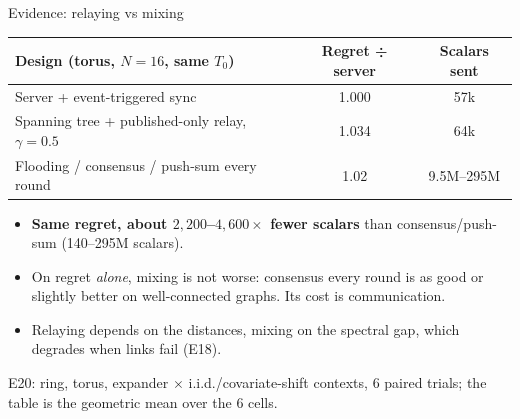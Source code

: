 \documentclass[11pt]{beamer}
\begin{document}
\begin{frame}{Evidence: relaying vs mixing}
\footnotesize
\renewcommand{\arraystretch}{1.1}
\begin{center}
\begin{tabular}{>{\raggedright\arraybackslash}p{5.2cm}cc}
\toprule
\textbf{Design} (torus, $N=16$, same $T_0$) & \textbf{Regret ÷ server} & \textbf{Scalars sent}\\
\midrule
Server + event-triggered sync & 1.000 & 57k\\
\alert{Spanning tree + published-only relay, $\gamma=0.5$} & \alert{1.034} & \alert{64k}\\
Flooding / consensus / push-sum every round & 1.02 & 9.5M--295M\\
\bottomrule
\end{tabular}
\end{center}
\begin{itemize}
\item \textbf{Same regret, about $2{,}200$--$4{,}600\times$ fewer scalars} than consensus/push-sum (140--295M scalars).
\item On regret \emph{alone}, mixing is not worse: consensus every round is as good or slightly better on well-connected graphs. Its cost is communication.
\item Relaying depends on the distances, mixing on the spectral gap, which degrades when links fail (E18).
\end{itemize}
{\tiny E20: ring, torus, expander $\times$ i.i.d./covariate-shift contexts, 6 paired trials; the table is the geometric mean over the 6 cells.}
\end{frame}
\end{document}
